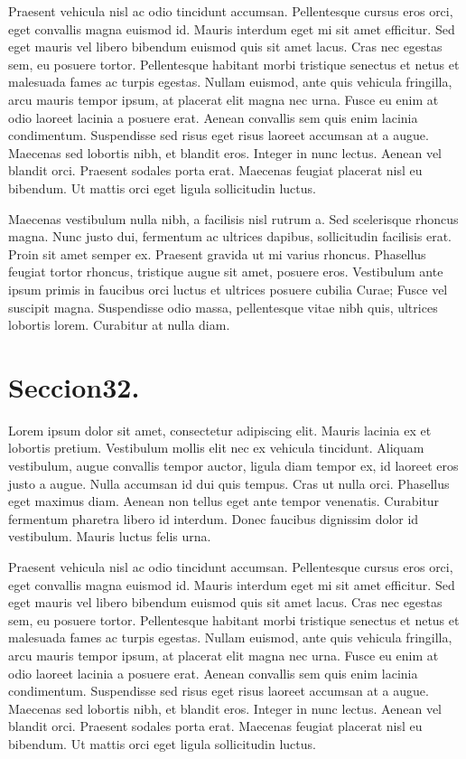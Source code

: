 Praesent vehicula nisl ac odio tincidunt accumsan. Pellentesque cursus eros orci, eget convallis magna euismod id. Mauris interdum eget mi sit amet efficitur. Sed eget mauris vel libero bibendum euismod quis sit amet lacus. Cras nec egestas sem, eu posuere tortor. Pellentesque habitant morbi tristique senectus et netus et malesuada fames ac turpis egestas. Nullam euismod, ante quis vehicula fringilla, arcu mauris tempor ipsum, at placerat elit magna nec urna. Fusce eu enim at odio laoreet lacinia a posuere erat. Aenean convallis sem quis enim lacinia condimentum. Suspendisse sed risus eget risus laoreet accumsan at a augue. Maecenas sed lobortis nibh, et blandit eros. Integer in nunc lectus. Aenean vel blandit orci. Praesent sodales porta erat. Maecenas feugiat placerat nisl eu bibendum. Ut mattis orci eget ligula sollicitudin luctus.

Maecenas vestibulum nulla nibh, a facilisis nisl rutrum a. Sed scelerisque rhoncus magna. Nunc justo dui, fermentum ac ultrices dapibus, sollicitudin facilisis erat. Proin sit amet semper ex. Praesent gravida ut mi varius rhoncus. Phasellus feugiat tortor rhoncus, tristique augue sit amet, posuere eros. Vestibulum ante ipsum primis in faucibus orci luctus et ultrices posuere cubilia Curae; Fusce vel suscipit magna. Suspendisse odio massa, pellentesque vitae nibh quis, ultrices lobortis lorem. Curabitur at nulla diam. 


\section{Seccion32.}

Lorem ipsum dolor sit amet, consectetur adipiscing elit. Mauris lacinia ex et lobortis pretium. Vestibulum mollis elit nec ex vehicula tincidunt. Aliquam vestibulum, augue convallis tempor auctor, ligula diam tempor ex, id laoreet eros justo a augue. Nulla accumsan id dui quis tempus. Cras ut nulla orci. Phasellus eget maximus diam. Aenean non tellus eget ante tempor venenatis. Curabitur fermentum pharetra libero id interdum. Donec faucibus dignissim dolor id vestibulum. Mauris luctus felis urna.

Praesent vehicula nisl ac odio tincidunt accumsan. Pellentesque cursus eros orci, eget convallis magna euismod id. Mauris interdum eget mi sit amet efficitur. Sed eget mauris vel libero bibendum euismod quis sit amet lacus. Cras nec egestas sem, eu posuere tortor. Pellentesque habitant morbi tristique senectus et netus et malesuada fames ac turpis egestas. Nullam euismod, ante quis vehicula fringilla, arcu mauris tempor ipsum, at placerat elit magna nec urna. Fusce eu enim at odio laoreet lacinia a posuere erat. Aenean convallis sem quis enim lacinia condimentum. Suspendisse sed risus eget risus laoreet accumsan at a augue. Maecenas sed lobortis nibh, et blandit eros. Integer in nunc lectus. Aenean vel blandit orci. Praesent sodales porta erat. Maecenas feugiat placerat nisl eu bibendum. Ut mattis orci eget ligula sollicitudin luctus.

